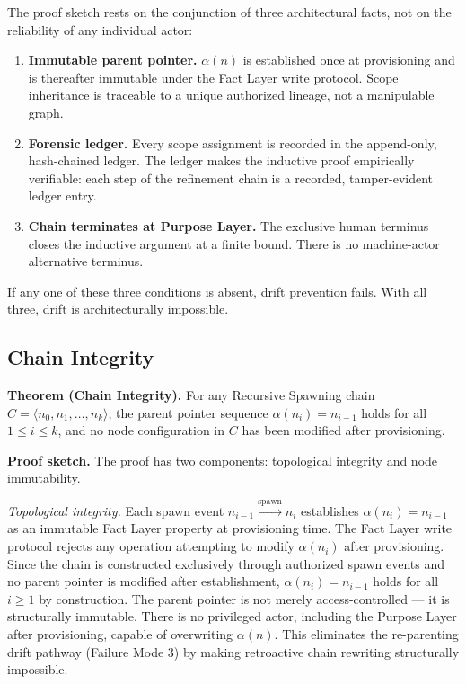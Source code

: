 \medskip
The proof sketch rests on the conjunction of three architectural facts, not on the reliability of any individual actor:

\begin{enumerate}
    \item[(1)] \textbf{Immutable parent pointer.} $\alpha(n)$ is established once at provisioning and is thereafter immutable under the Fact Layer write protocol. Scope inheritance is traceable to a unique authorized lineage, not a manipulable graph.
    \item[(2)] \textbf{Forensic ledger.} Every scope assignment is recorded in the append-only, hash-chained ledger. The ledger makes the inductive proof empirically verifiable: each step of the refinement chain is a recorded, tamper-evident ledger entry.
    \item[(3)] \textbf{Chain terminates at Purpose Layer.} The exclusive human terminus closes the inductive argument at a finite bound. There is no machine-actor alternative terminus.
\end{enumerate}

If any one of these three conditions is absent, drift prevention fails. With all three, drift is architecturally impossible.

\subsection{Chain Integrity}
\label{sec:rs-chain-integrity}

\medskip
\noindent\textbf{Theorem (Chain Integrity).} For any Recursive Spawning chain $C = \langle n_0, n_1, \ldots, n_k \rangle$, the parent pointer sequence $\alpha(n_i) = n_{i-1}$ holds for all $1 \leq i \leq k$, and no node configuration in $C$ has been modified after provisioning.

\medskip
\noindent\textbf{Proof sketch.} The proof has two components: topological integrity and node immutability.

\medskip
\textit{Topological integrity.} Each spawn event $n_{i-1} \xrightarrow{\mathrm{spawn}} n_i$ establishes $\alpha(n_i) = n_{i-1}$ as an immutable Fact Layer property at provisioning time. The Fact Layer write protocol rejects any operation attempting to modify $\alpha(n_i)$ after provisioning. Since the chain is constructed exclusively through authorized spawn events and no parent pointer is modified after establishment, $\alpha(n_i) = n_{i-1}$ holds for all $i \geq 1$ by construction. The parent pointer is not merely access-controlled --- it is structurally immutable. There is no privileged actor, including the Purpose Layer after provisioning, capable of overwriting $\alpha(n)$. This eliminates the re-parenting drift pathway (Failure Mode 3) by making retroactive chain rewriting structurally impossible.

